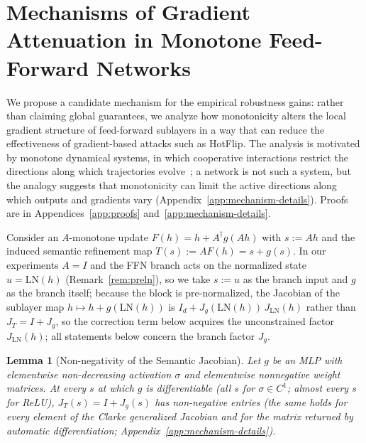 \documentclass{article}
\theoremstyle{plain}
\newtheorem{lemma}[theorem]{Lemma}
\theoremstyle{definition}
\theoremstyle{remark}
\theoremstyle{plain}
\begin{document}
\section{Mechanisms of Gradient Attenuation in Monotone Feed-Forward Networks}
\label{sec:gradient-attenuation}
We propose a candidate mechanism for the empirical robustness gains: rather than claiming global guarantees, we analyze how monotonicity alters the local gradient structure of feed-forward sublayers in a way that can reduce the effectiveness of gradient-based attacks such as HotFlip. The analysis is motivated by monotone dynamical systems, in which cooperative interactions restrict the directions along which trajectories evolve~\citep{hirsch1985systems}; a network is not such a system, but the analogy suggests that monotonicity can limit the active directions along which outputs and gradients vary (Appendix~\ref{app:mechanism-details}). Proofs are in Appendices~\ref{app:proofs} and~\ref{app:mechanism-details}.

Consider an $A$-monotone update $F(h) = h + A^\dagger g(Ah)$ with $s := Ah$ and the induced semantic refinement map $T(s) := AF(h) = s + g(s)$. In our experiments $A = I$ and the FFN branch acts on the normalized state $u = \mathrm{LN}(h)$ (Remark~\ref{rem:preln}), so we take $s := u$ as the branch input and $g$ as the branch itself; because the block is pre-normalized, the Jacobian of the sublayer map $h \mapsto h + g(\mathrm{LN}(h))$ is $I_d + J_g(\mathrm{LN}(h))\,J_{\mathrm{LN}}(h)$ rather than $J_T = I + J_g$, so the correction term below acquires the unconstrained factor $J_{\mathrm{LN}}(h)$; all statements below concern the branch factor $J_g$.

\begin{lemma}[Non-negativity of the Semantic Jacobian]
\label{lem:jacobian-nonneg}
Let $g$ be an MLP with elementwise non-decreasing activation $\sigma$ and elementwise nonnegative weight matrices. At every $s$ at which $g$ is differentiable (all $s$ for $\sigma \in C^1$; almost every $s$ for ReLU), $J_T(s) = I + J_g(s)$ has non-negative entries (the same holds for every element of the Clarke generalized Jacobian and for the matrix returned by automatic differentiation; Appendix~\ref{app:mechanism-details}).
\end{lemma}
\end{document}
